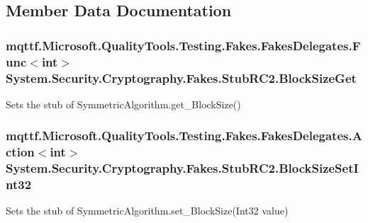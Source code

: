 \subsection{Member Data Documentation}
\hypertarget{class_system_1_1_security_1_1_cryptography_1_1_fakes_1_1_stub_r_c2_a16a746f8c1c1b2e73f7f8306c4f8507c}{
\subsubsection[{Block\-Size\-Get}]{\setlength{\rightskip}{0pt plus 5cm}mqttf.\-Microsoft.\-Quality\-Tools.\-Testing.\-Fakes.\-Fakes\-Delegates.\-Func$<$int$>$ System.\-Security.\-Cryptography.\-Fakes.\-Stub\-R\-C2.\-Block\-Size\-Get}}\label{class_system_1_1_security_1_1_cryptography_1_1_fakes_1_1_stub_r_c2_a16a746f8c1c1b2e73f7f8306c4f8507c}


Sets the stub of Symmetric\-Algorithm.\-get\-\_\-\-Block\-Size()

\hypertarget{class_system_1_1_security_1_1_cryptography_1_1_fakes_1_1_stub_r_c2_afc3b67423280fda05cc23cefdbf2c6e5}{
\subsubsection[{Block\-Size\-Set\-Int32}]{\setlength{\rightskip}{0pt plus 5cm}mqttf.\-Microsoft.\-Quality\-Tools.\-Testing.\-Fakes.\-Fakes\-Delegates.\-Action$<$int$>$ System.\-Security.\-Cryptography.\-Fakes.\-Stub\-R\-C2.\-Block\-Size\-Set\-Int32}}\label{class_system_1_1_security_1_1_cryptography_1_1_fakes_1_1_stub_r_c2_afc3b67423280fda05cc23cefdbf2c6e5}


Sets the stub of Symmetric\-Algorithm.\-set\-\_\-\-Block\-Size(\-Int32 value)

